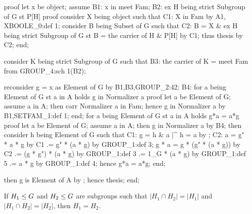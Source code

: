 \nwenddocs{}\endmoddef\nwstartdeflinemarkup{}\nwenddeflinemarkup
proof
  let x be object;
  assume B1: x in meet Fam;
  B2: ex H being strict Subgroup of G st P[H]
  proof
    consider X being object such that
    C1: X in Fam by A1, XBOOLE_0:def 1;
    consider B being Subset of G such that
    C2: B = X & ex H being strict Subgroup of G st B = the carrier of H & P[H]
    by C1;
    thus thesis by C2;
  end;

  consider K being strict Subgroup of G such that
  B3: the carrier of K = meet Fam
  from GROUP_4:sch 1(B2);

  reconsider g = x as Element of G by B1,B3,GROUP_2:42;
  B4: for a being Element of G st a in A
  holds g in Normalizer a
  proof
    let a be Element of G;
    assume a in A;
    then carr Normalizer a in Fam;
    hence g in Normalizer a by B1,SETFAM_1:def 1;
  end;
  for a being Element of G st a in A holds g*a = a*g
  proof
    let a be Element of G;
    assume a in A;
    then g in Normalizer a by B4;
    then consider h being Element of G such that
    C1: g = h & a |^ h = a
    by ;
    C2: a = g" * a * g by C1
         .= g" * (a * g) by GROUP_1:def 3;
    g * a = g * (g" * (a * g)) by C2
         .= (g * g") * (a * g) by GROUP_1:def 3
         .= 1_G * (a * g) by GROUP_1:def 5
         .= a * g by GROUP_1:def 4;
    hence g*a = a*g;
  end;

  then g is Element of  A by ;
  hence thesis;
end;
\nwendcode{}\nwdocspar



\begin{theorem}
If $H_{1}\leq G$ and $H_{2}\leq G$ are subgroups such that
$|H_{1}\cap H_{2}|=|H_{1}|$ and $|H_{1}\cap H_{2}|=|H_{2}|$, then $H_{1}=H_{2}$.
\end{theorem}

